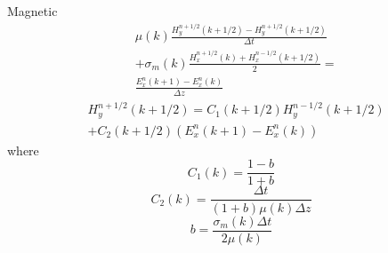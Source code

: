 \documentclass[a4paper,10pt]{article}
\begin{document}
Magnetic
\begin{equation}
\begin{aligned}
&\mu(k)\frac{H^{n+1/2}_{y}(k+1/2)-H^{n+1/2}_{y}(k+1/2)}{\Delta t}\\
&+\sigma_m(k)\frac{H^{n+1/2}_{x}(k)+H^{n-1/2}_{x}(k+1/2)}{2}=\\
&\frac{E^{n}_{x}(k+1)-E^{n}_{x}(k)}{\Delta z}
\end{aligned}
\end{equation}
\begin{equation}
\begin{aligned}
&H^{n+1/2}_{y}(k+1/2)=C_{1}(k+1/2)H^{n-1/2}_{y}(k+1/2)\\
&+C_{2}(k+1/2)\left(E^{n}_{x}(k+1)-E^{n}_{x}(k)\right)
\end{aligned}
\end{equation}
where 
\begin{equation}
C_{1}(k)=\frac{1-b}{1+b}
\end{equation}
\begin{equation}
C_{2}(k)=\frac{\Delta t}{(1+b)\mu(k)\Delta z}
\end{equation}
\begin{equation}
b=\frac{\sigma_m(k)\Delta t}{2\mu(k)}
\end{equation}
\end{document}
